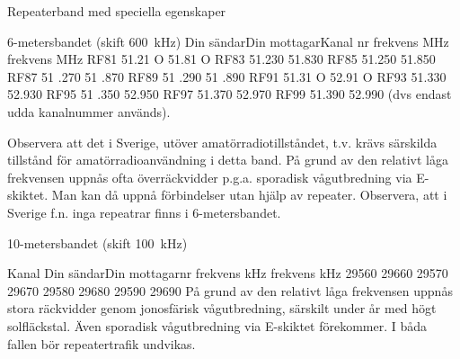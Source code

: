 Repeaterband med speciella egenskaper

6-metersbandet (skift 600~kHz)
Din sändarDin mottagarKanal
nr
frekvens MHz frekvens MHz
RF81
51.21 O
51.81 O
RF83
51.230
51.830
RF85
51.250
51.850
RF87
51 .270
51 .870
RF89
51 .290
51 .890
RF91
51.31 O
52.91 O
RF93
51.330
52.930
RF95
51 .350
52.950
RF97
51.370
52.970
RF99
51.390
52.990
(dvs endast udda kanalnummer används).

Observera att det i Sverige, utöver amatörradiotillståndet, t.v. krävs
särskilda tillstånd för amatörradioanvändning i detta band.
På grund av den relativt låga frekvensen uppnås ofta överräckvidder p.g.a.
sporadisk vågutbredning via E-skiktet.
Man kan då uppnå förbindelser utan hjälp av repeater.
Observera, att i Sverige f.n. inga repeatrar finns i 6-metersbandet.

10-metersbandet (skift 100~kHz)

Kanal
Din sändarDin mottagarnr
frekvens kHz
frekvens kHz
29560
29660
29570
29670
29580
29680
29590
29690
På grund av den relativt låga frekvensen uppnås stora räckvidder genom
jonosfärisk vågutbredning, särskilt under år med högt solfläckstal.
Även sporadisk vågutbredning via E-skiktet förekommer.
I båda fallen bör repeatertrafik undvikas.
